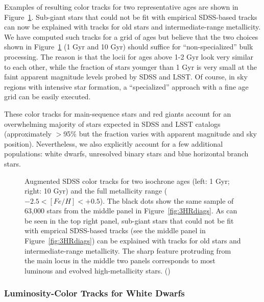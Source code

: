 Examples of resulting color tracks for two representative ages are shown in Figure~\ref{fig:augmLocus}. Sub-giant stars that could not
be fit with empirical SDSS-based tracks can now be explained with tracks for old stars and intermediate-range metallicity. 
We have computed such tracks for a grid of ages but believe that the two choices shown in Figure~\ref{fig:augmLocus}
(1 Gyr and 10 Gyr) should suffice for ``non-specialized'' bulk processing. The reason is that the locii for ages above 1-2 Gyr look
very similar to each other, while the fraction of stars younger than 1 Gyr is very small at the faint apparent magnitude
levels probed by SDSS and LSST. Of course, in sky regions with intensive star formation, a ``specialized'' approach with
a fine age grid can be easily executed. 

These color tracks for main-sequence stars and red giants account for an overwhelming majority of stars 
expected in SDSS and LSST catalogs (approximately $>$95\% but the fraction varies with apparent magnitude and sky position). 
Nevertheless, we also explicitly account for a few additional populations: white dwarfs, unresolved binary stars and
blue horizontal branch stars. 



\begin{figure}[b!]
\caption{Augmented SDSS color tracks for two isochrone ages (left: 1 Gyr; right: 10 Gyr) and the full metallicity range
  ($-2.5 < [Fe/H] < +0.5$). The black dots show the same sample of 63,000 stars from the middle panel in
  Figure~\ref{fig:3HRdiags}. As can be seen in the top right panel, sub-giant stars that could not be fit with emprical
  SDSS-based tracks (see the middle panel in Figure~\ref{fig:3HRdiags}) can be explained with tracks for old stars and
  intermediate-range metallicity. The sharp feature protruding from the main locus in the middle two panels corresponds
  to most luminous and evolved high-metallicity stars. 
()}
\label{fig:augmLocus}
\end{figure}


\subsubsection{Luminosity-Color Tracks for White Dwarfs}

